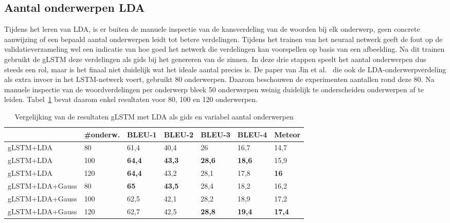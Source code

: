 \subsection{Aantal onderwerpen LDA}
Tijdens het leren van LDA, is er buiten de manuele inspectie van de kansverdeling van de woorden bij elk onderwerp, geen concrete aanwijzing of een bepaald aantal onderwerpen leidt tot betere verdelingen.
Tijdens het trainen van het neuraal netwerk geeft de fout op de validatieverzameling wel een indicatie van hoe goed het netwerk die verdelingen kan voorspellen op basis van een afbeelding.
Na dit trainen gebruikt de gLSTM deze verdelingen als gids bij het genereren van de zinnen.
In deze drie stappen speelt het aantal onderwerpen dus steeds een rol, maar is het finaal niet duidelijk wat het ideale aantal precies is.
De paper van Jin et al.~\cite{Jin2015} die ook de LDA-onderwerpverdeling als extra invoer in het LSTM-netwerk voert, gebruikt 80 onderwerpen.
Daarom beschouwen de experimenten aantallen rond deze 80. Na manuele inspectie van de woordverdelingen per onderwerp bleek 50 onderwerpen weinig duidelijk te onderscheiden onderwerpen af te leiden.
Tabel~\ref{table:lda-onderwerpen} bevat daarom enkel resultaten voor 80, 100 en 120 onderwerpen.

    \begin{table}
    	\centering
    	\begin{tabular}{lllllll}
    		~                 &\#onderw.  & BLEU-1 & BLEU-2 & BLEU-3 & BLEU-4 & Meteor \\ \hline
    		gLSTM+LDA       & 80  & 61,4   & 40,4  & 26   & 16,7   & 14,7     \\ 
    		gLSTM+LDA      & 100  & \textbf{64,4}   & \textbf{43,3}   & \textbf{28,6}   & \textbf{18,6}   & 15,9  \\
    		gLSTM+LDA      &120   & \textbf{64,4}   & 43,2   & 28,1   & 17,8   & \textbf{16}  \\\hline
    		gLSTM+LDA+Gauss &80 & \textbf{65}   & \textbf{43,5}   & 28,4   & 18,2   & 16,2  \\ 
    		gLSTM+LDA+Gauss& 100&62,5& 42,1   & 28,2   & 18,9   & 17,2    \\
    	gLSTM+LDA+Gauss&120 & 62,7   & 42,5   &\textbf{28,8}   & \textbf{19,4}   & \textbf{17,4}  \\\hline
    	\end{tabular}
    	\caption{Vergelijking van de resultaten gLSTM met LDA als gids en variabel aantal onderwerpen}	
    	\label{table:lda-onderwerpen}
    \end{table}
    
